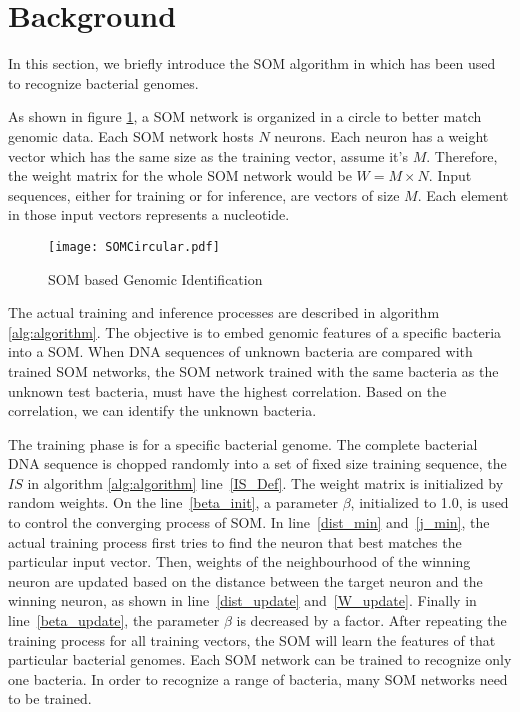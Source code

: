 \section{Background}
In this section, we briefly introduce the SOM algorithm in \cite{Yang2018RiBoSOM} which has been used to recognize bacterial genomes.

As shown in figure \ref{fig:algorithm}, a SOM network is organized in a circle to better match genomic data. Each SOM network hosts $N$ neurons. Each neuron has a weight vector which has the same size as the training vector, assume it's $M$. Therefore, the weight matrix for the whole SOM network would be $W=M \times N$. Input sequences, either for training or for inference, are vectors of size $M$. Each element in those input vectors represents a nucleotide.
\begin{figure}[htb]
	\centerline{\texttt{[image: SOMCircular.pdf]}}
	\caption{SOM based Genomic Identification}
	\label{fig:algorithm}
\end{figure}

The actual training and inference processes are described in algorithm \ref{alg:algorithm}. The objective is to embed genomic features of a specific bacteria into a SOM. When DNA sequences of unknown bacteria are compared with trained SOM networks, the SOM network trained with the same bacteria as the unknown test bacteria, must have the highest correlation. Based on the correlation, we can identify the unknown bacteria.

The training phase is for a specific bacterial genome. The complete bacterial DNA sequence is chopped randomly into a set of fixed size training sequence, the $IS$ in algorithm \ref{alg:algorithm} line~\ref{IS_Def}. The weight matrix is initialized by random weights. On the line~\ref{beta_init}, a parameter $\beta$, initialized to 1.0, is used to control the converging process of SOM. In line~\ref{dist_min} and~\ref{j_min}, the actual training process first tries to find the neuron that best matches the particular input vector. Then, weights of the neighbourhood of the winning neuron are updated based on the distance between the target neuron and the winning neuron, as shown in line~\ref{dist_update} and~\ref{W_update}. Finally in line~\ref{beta_update}, the parameter $\beta$ is decreased by a factor. After repeating the training process for all training vectors, the SOM will learn the features of that particular bacterial genomes. Each SOM network can be trained to recognize only one bacteria. In order to recognize a range of bacteria, many SOM networks need to be trained.

